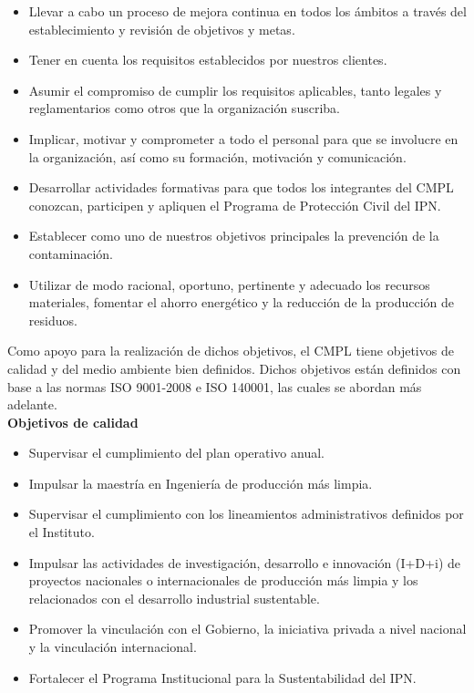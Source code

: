 	\begin{itemize}
		\item Llevar a cabo un proceso de mejora continua en todos los ámbitos a través del establecimiento y revisión de objetivos y metas.
		\item Tener en cuenta los requisitos establecidos por nuestros clientes.
		\item Asumir el compromiso de cumplir los requisitos aplicables, tanto legales y reglamentarios como otros que la organización suscriba.
		\item Implicar, motivar y comprometer a todo el personal para que se involucre en la organización, así como su formación, motivación y comunicación.
		\item Desarrollar actividades formativas para que todos los integrantes del CMPL conozcan, participen y apliquen el Programa de Protección Civil del IPN.
		\item Establecer como uno de nuestros objetivos principales la prevención de la contaminación.
		\item Utilizar de modo racional, oportuno, pertinente y adecuado los recursos materiales, fomentar el ahorro energético y la reducción de la producción de residuos. 
	\end{itemize}

	Como apoyo para la realización de dichos objetivos, el CMPL tiene objetivos de calidad y del medio ambiente bien definidos. Dichos objetivos están definidos con base a las normas ISO 9001-2008 e ISO 140001, las cuales se abordan más adelante.\\

\textbf{Objetivos de calidad}

\begin{itemize}
	\item Supervisar el cumplimiento del plan operativo anual.
	\item Impulsar la maestría en Ingeniería de producción más limpia.
	\item Supervisar el cumplimiento con los lineamientos administrativos definidos por el Instituto.
	\item Impulsar las actividades de investigación, desarrollo e innovación (I+D+i) de proyectos nacionales o internacionales de producción más limpia y los relacionados con el desarrollo industrial sustentable.
 \item Promover la vinculación con el Gobierno, la iniciativa privada a nivel nacional y la vinculación internacional.
	\item Fortalecer el Programa Institucional para la Sustentabilidad del IPN.
\end{itemize}

